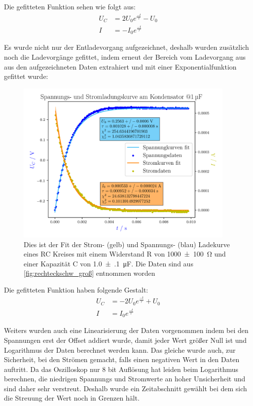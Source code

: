 \documentclass[11pt,ngerman]{scrartcl}
\begin{document}
Die gefitteten Funktion sehen wie folgt aus:
\begin{align*}
	U_C & = 2U_0 e^{\frac{-t}{\tau}} - U_0 \\
	I   & = -I_0 e^{\frac{-t}{\tau}}
\end{align*}

Es wurde nicht nur der Entladevorgang aufgezeichnet, deshalb wurden zusätzlich noch die
Ladevorgänge gefittet, indem erneut der Bereich vom Ladevorgang aus aus den
aufgezeichneten Daten extrahiert und mit einer Exponentialfunktion gefittet wurde:

\begin{figure}[H]
	\begin{center}
		\includegraphics[width=0.95\textwidth]{figures/ladekurve}
	\end{center}
	\caption{Dies ist der Fit der Strom- (gelb) und Spannungs- (blau) Ladekurve eines RC Kreises mit einem
		Widerstand R von \SI{1000(100)}{\ohm} und einer Kapazität C von
		\SI{1.0(1)}{\micro\farad}. Die Daten sind aus \autoref{fig:rechteckschw_groß}
		entnommen worden}
	\label{fig:ladekurve}
\end{figure}

Die gefitteten Funktion haben folgende Gestalt:
\begin{align*}
	U_C & = -2U_0 e^{\frac{-t}{\tau}} + U_0 \\
	I   & = I_0 e^{\frac{-t}{\tau}}
\end{align*}

Weiters wurden auch eine Linearisierung der Daten vorgenommen indem bei den
Spannungen erst der Offset addiert wurde, damit jeder Wert größer Null
ist und Logarithmus der Daten berechnet werden kann. Das gleiche wurde auch, zur
Sicherheit, bei den Strömen gemacht, falls einen negativen Wert in den Daten auftritt.
Da das Oszilloskop nur 8 bit Auflösung hat leiden beim Logarithmus berechnen, die niedrigen
Spannungs und Stromwerte an hoher Unsicherheit und sind daher sehr verstreut. Deshalb
wurde ein Zeitabschnitt gewählt bei dem sich die Streuung der Wert noch in Grenzen hält.
\end{document}
